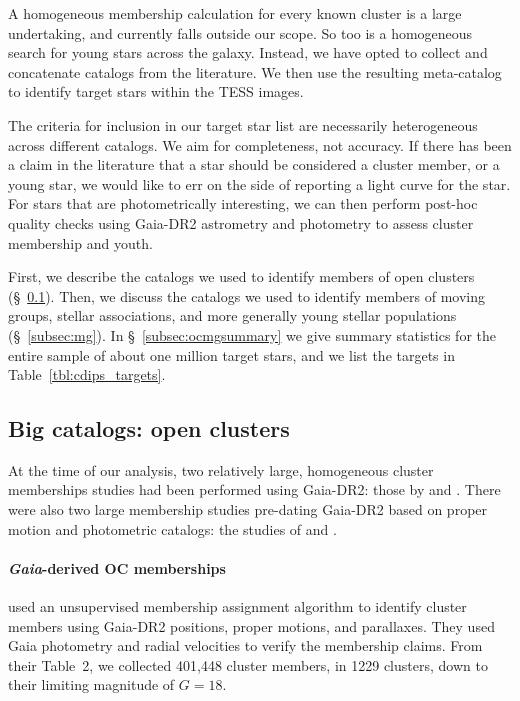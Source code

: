 \documentclass[12pt,twocolumn,tighten]{aastex62}
\begin{document}
A homogeneous membership calculation for every known cluster is a
large undertaking, and currently falls outside our scope.  So too is a
homogeneous search for young stars across the galaxy.  Instead, we
have opted to collect and concatenate catalogs from the literature.
We then use the resulting meta-catalog to identify target stars within
the TESS images.

The criteria for inclusion in our target star list are necessarily
heterogeneous across different catalogs.  We aim for completeness, not
accuracy.  If there has been a claim in the literature that a star
should be considered a cluster member, or a young star, we would like
to err on the side of reporting a light curve for the star.  For stars
that are photometrically interesting, we can then perform post-hoc
quality checks using Gaia-DR2 astrometry and photometry to assess
cluster membership and youth.

First, we describe the catalogs we used to identify members of open
clusters (\S~\ref{subsec:oc}).  Then, we discuss the catalogs we used
to identify members of moving groups, stellar associations, and more
generally young stellar populations (\S~\ref{subsec:mg}).  In
\S~\ref{subsec:ocmgsummary} we give
summary statistics for the entire sample of about one million target
stars, and we list the targets in Table~\ref{tbl:cdips_targets}.

\subsection{Big catalogs: open clusters}
\label{subsec:oc}

At the time of our analysis, two relatively large, homogeneous cluster
memberships studies had been performed using Gaia-DR2: those by
\citet{cantat-gaudin_gaia_2018} and \citet{gaia_hr_2018}.  There were
also two large membership studies pre-dating Gaia-DR2 based on proper
motion and photometric catalogs: the studies of
\citet{Kharchenko_et_al_2013} and \citet{dias_proper_2014}.

\paragraph{{\it Gaia}-derived OC memberships}

\citet{cantat-gaudin_gaia_2018} used an unsupervised membership
assignment algorithm \citep{krone-martins_upmask_2014} to identify
cluster members using Gaia-DR2 positions, proper motions, and
parallaxes.  They used Gaia photometry and radial velocities to verify
the membership claims.  From their Table~2, we collected 401{,}448
cluster members, in 1229 clusters, down to their limiting magnitude of
$G=18$.
\end{document}
